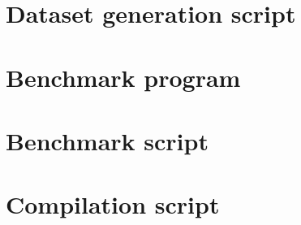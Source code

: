 \documentclass[12pt]{article}
\begin{document}
\begin{appendices}
	\section{Dataset generation script}
	\label{app:dataset}

	
	
	\section{Benchmark program}
	\label{app:benchmark}

	
	
	\section{Benchmark script}
	\label{app:benchmark-script}

	
	
	\section{Compilation script}
	\label{app:compilation}

	

\end{appendices}
\end{document}
